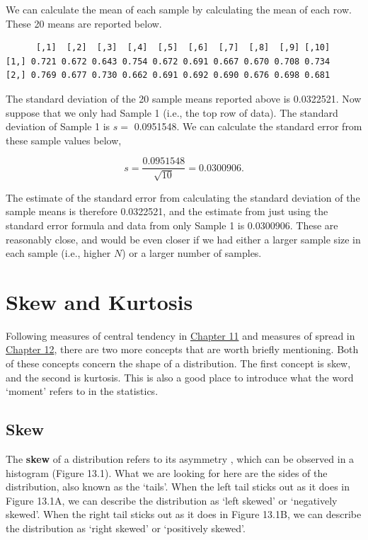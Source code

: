 \documentclass[
]{scrbook}
\begin{document}
We can calculate the mean of each sample by calculating the mean of each row.
These 20 means are reported below.

\begin{verbatim}
      [,1]  [,2]  [,3]  [,4]  [,5]  [,6]  [,7]  [,8]  [,9] [,10]
[1,] 0.721 0.672 0.643 0.754 0.672 0.691 0.667 0.670 0.708 0.734
[2,] 0.769 0.677 0.730 0.662 0.691 0.692 0.690 0.676 0.698 0.681
\end{verbatim}

The standard deviation of the 20 sample means reported above is 0.0322521.
Now suppose that we only had Sample 1 (i.e., the top row of data).
The standard deviation of Sample 1 is \(s =\) 0.0951548.
We can calculate the standard error from these sample values below,

\[s = \frac{0.0951548}{\sqrt{10}} = 0.0300906.\]

The estimate of the standard error from calculating the standard deviation of the sample means is therefore 0.0322521, and the estimate from just using the standard error formula and data from only Sample 1 is 0.0300906.
These are reasonably close, and would be even closer if we had either a larger sample size in each sample (i.e., higher \(N\)) or a larger number of samples.

\hypertarget{skew-and-kurtosis}{%
\chapter{Skew and Kurtosis}\label{skew-and-kurtosis}}

Following measures of central tendency in \protect\hyperlink{Chapter_11}{Chapter 11} and measures of spread in \protect\hyperlink{Chapter_12}{Chapter 12}, there are two more concepts that are worth briefly mentioning.
Both of these concepts concern the shape of a distribution.
The first concept is skew, and the second is kurtosis.
This is also a good place to introduce what the word `moment' refers to in the statistics.

\hypertarget{skew}{%
\section{Skew}\label{skew}}

The \textbf{skew} of a distribution refers to its asymmetry \citep{Sokal1995, Dytham2011}, which can be observed in a histogram (Figure 13.1).
What we are looking for here are the sides of the distribution, also known as the `tails'.
When the left tail sticks out as it does in Figure 13.1A, we can describe the distribution as `left skewed' or `negatively skewed'.
When the right tail sticks out as it does in Figure 13.1B, we can describe the distribution as `right skewed' or `positively skewed'.
\end{document}
